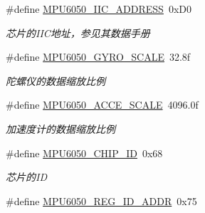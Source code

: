 \begin{DoxyCompactItemize}
\item 
\#define \hyperlink{group__mpu6050__driver_ga4a9abee2bb288d66f5252cbf247ef439}{M\+P\+U6050\+\_\+\+I\+I\+C\+\_\+\+A\+D\+D\+R\+E\+SS}~0x\+D0\hypertarget{group__mpu6050__driver_ga4a9abee2bb288d66f5252cbf247ef439}{}\label{group__mpu6050__driver_ga4a9abee2bb288d66f5252cbf247ef439}

\begin{DoxyCompactList}\small\item\em 芯片的\+I\+I\+C地址，参见其数据手册 \end{DoxyCompactList}\item 
\#define \hyperlink{group__mpu6050__driver_ga733d4101fbe427bedb2f15ca20b71bac}{M\+P\+U6050\+\_\+\+G\+Y\+R\+O\+\_\+\+S\+C\+A\+LE}~32.\+8f\hypertarget{group__mpu6050__driver_ga733d4101fbe427bedb2f15ca20b71bac}{}\label{group__mpu6050__driver_ga733d4101fbe427bedb2f15ca20b71bac}

\begin{DoxyCompactList}\small\item\em 陀螺仪的数据缩放比例 \end{DoxyCompactList}\item 
\#define \hyperlink{group__mpu6050__driver_ga669a13ba6d055905339a57b50ecd8b3a}{M\+P\+U6050\+\_\+\+A\+C\+C\+E\+\_\+\+S\+C\+A\+LE}~4096.\+0f\hypertarget{group__mpu6050__driver_ga669a13ba6d055905339a57b50ecd8b3a}{}\label{group__mpu6050__driver_ga669a13ba6d055905339a57b50ecd8b3a}

\begin{DoxyCompactList}\small\item\em 加速度计的数据缩放比例 \end{DoxyCompactList}\item 
\#define \hyperlink{group__mpu6050__driver_gac9f31f774cd2699e69ae7e7b7f224483}{M\+P\+U6050\+\_\+\+C\+H\+I\+P\+\_\+\+ID}~0x68\hypertarget{group__mpu6050__driver_gac9f31f774cd2699e69ae7e7b7f224483}{}\label{group__mpu6050__driver_gac9f31f774cd2699e69ae7e7b7f224483}

\begin{DoxyCompactList}\small\item\em 芯片的\+ID \end{DoxyCompactList}\item 
\#define \hyperlink{group__mpu6050__driver_gacb2b34ee8979b3165680de2313fe7f7f}{M\+P\+U6050\+\_\+\+R\+E\+G\+\_\+\+I\+D\+\_\+\+A\+D\+DR}~0x75\hypertarget{group__mpu6050__driver_gacb2b34ee8979b3165680de2313fe7f7f}{}\label{group__mpu6050__driver_gacb2b34ee8979b3165680de2313fe7f7f}


\end{DoxyCompactItemize}
